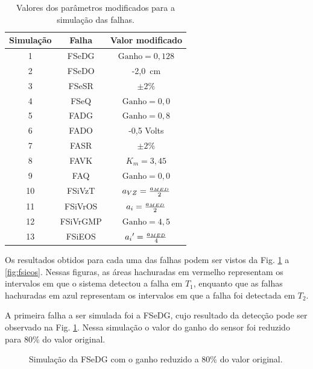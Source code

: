 \begin{table}[htb]
\centering
\caption{Valores dos parâmetros modificados para a simulação das falhas.}
\label{tab:valores_parametros}
\vspace{0.25cm}
\begin{tabular}{|c|c|c|}
\hline
{\bf Simulação} & {\bf Falha} & {\bf Valor modificado}\\
\hline
\hline
1 & FSeDG & $\text{Ganho} = 0,128$\\
\hline
2 & FSeDO & -2,0\ cm\\
\hline
3 & FSeSR & $\pm 2\%$\\
\hline
4 & FSeQ & $\text{Ganho} = 0,0$\\
\hline
\hline
5 & FADG & $\text{Ganho} = 0,8$\\
\hline
6 & FADO & -0,5 Volts\\
\hline
7 & FASR & $\pm 2\%$\\
\hline
8 & FAVK & $K_m = 3,45$\\ 
\hline
9 & FAQ & $\text{Ganho} = 0,0$\\
\hline
\hline
10 & FSiVzT & $a_{\tiny VZ} = \frac{a_{\tiny MED}}{2}$\\
\hline
11 & FSiVrOS & $a_i = \frac{a_{\tiny MED}}{2}$\\
\hline
12 & FSiVrGMP & $\text{Ganho} = 4,5$\\
\hline
13 & FSiEOS & ${a_i}' = \frac{a_{\tiny MED}}{4}$\\
\hline
\end{tabular}
\end{table}

Os resultados obtidos para cada uma das falhas podem ser vistos da Fig.
\ref{fig:fsedg} a \ref{fig:fsieos}. Nessas figuras, as áreas hachuradas em
vermelho representam os intervalos em que o sistema detectou a falha em $T_1$,
enquanto que as falhas hachuradas em azul representam os intervalos em que a
falha foi detectada em $T_2$.

A primeira falha a ser simulada foi a FSeDG, cujo resultado da detecção pode ser
observado na Fig. \ref{fig:fsedg}. Nessa simulação o valor do ganho do sensor
foi reduzido para 80\% do valor original. 

\begin{figure}[htb]
\footnotesize
\centering

\vspace{1cm}
\caption{Simulação da FSeDG com o ganho reduzido a 80\% do valor original.}
\label{fig:fsedg}
\end{figure}


